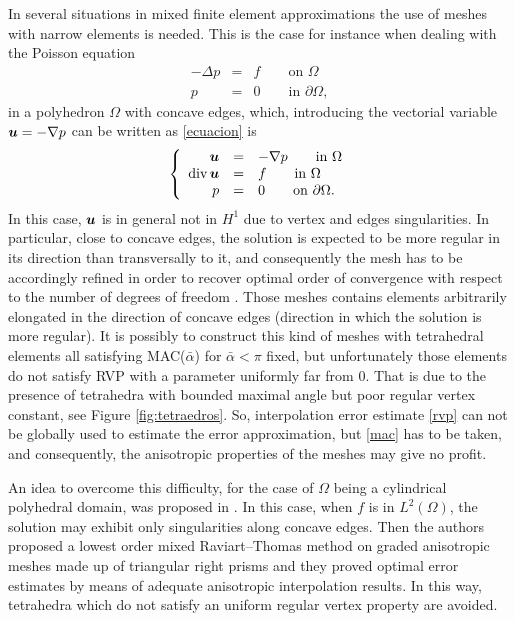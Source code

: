 In several situations in mixed finite element approximations the use of meshes with narrow elements is needed. This is the case for instance when dealing with the Poisson equation 
\begin{eqnarray}\label{ecuacion}
-\Delta p &=& f\qquad \mbox{on }\Omega\\\nonumber p&=&0\qquad \mbox{in }\partial\Omega,
\end{eqnarray}
in a polyhedron $\Omega$ with concave edges, which, introducing the vectorial variable $\boldsymbol{u}=-\nabla p$ can be written as
\eqref{ecuacion} is
\begin{equation}\label{mf} \left\{\begin{array}{rcl}
\boldsymbol{u}&=&-\nabla p\qquad \mbox{in }\Omega\\
\mbox{div\,}\boldsymbol{u}&=&f\qquad \mbox{in }\Omega\\
p&=&0\qquad\mbox{on }\partial\Omega.\end{array}\right.
\end{equation}
In this case,  $\boldsymbol{u}$ is in general not in $H^1$ due to vertex and edges singularities. In particular, close to concave edges, the solution is expected to be more regular in its direction than transversally to it, and consequently the mesh has to be accordingly refined in order to recover optimal order of convergence with respect to the number of degrees of freedom \cite{A, ALW, AN}. Those meshes contains elements arbitrarily elongated in the direction of concave edges (direction in which the solution is more regular). It is possibly to construct this kind of meshes with tetrahedral elements all satisfying MAC($\bar\alpha$) for $\bar\alpha<\pi$ fixed, but unfortunately those elements do not satisfy RVP with a parameter uniformly far from $0$. That is due to the presence of tetrahedra with bounded maximal angle but poor regular vertex constant, see Figure \ref{fig:tetraedros}. So, interpolation error estimate \eqref{rvp} can not be globally used to estimate the error approximation, but \eqref{mac} has to be taken, and consequently, the anisotropic properties of the meshes may give no profit.  

\tetsTikz


An idea to overcome this difficulty, for the case of $\Omega$ being a cylindrical polyhedral domain, was proposed in \cite{FNP}. In  this case, when $f$ is in $L^2(\Omega)$, the solution may exhibit only singularities along concave edges. Then the authors proposed a lowest order mixed Raviart--Thomas method on graded anisotropic meshes made up of triangular right prisms and they proved optimal error estimates by means of adequate anisotropic interpolation results. In this way, tetrahedra which do not satisfy an uniform regular vertex property are avoided. 

